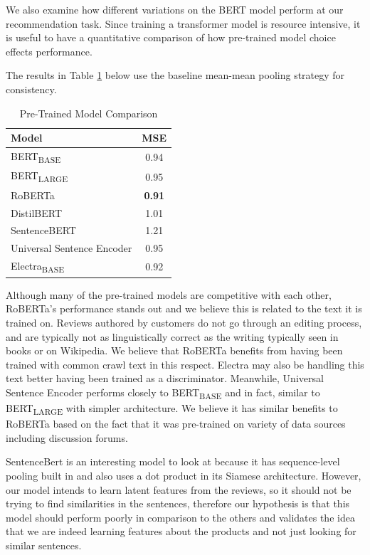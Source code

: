 \documentclass[11pt,a4paper]{article}
\begin{document}
We also examine how different variations on the BERT model perform at our recommendation task.  Since training a transformer model is resource intensive, it is useful to have a quantitative comparison of how pre-trained model choice effects performance.  

The results in Table \ref{table:2} below use the baseline mean-mean pooling strategy for consistency.

\begin{table}[H]
\centering
\small
\begin{tabular}{@{} l c @{}}
\toprule
\multicolumn{1}{l}{\textbf{Model}}    & \textbf{MSE}  \\ 
\midrule
 BERT\textsubscript{BASE} \citep{devlin2019bert} & 0.94 \\ 
 BERT\textsubscript{LARGE} & 0.95 \\
 RoBERTa \citep{liu2019roberta} & \textbf{0.91} \\
 DistilBERT \citep{sanh2020distilbert} & 1.01 \\
 SentenceBERT \citep{reimers2019sentencebert}  & 1.21 \\
 Universal Sentence Encoder \citep{cer2018universal}  & 0.95 \\
 Electra\textsubscript{BASE} \citep{clark2020electra} & 0.92 \\
\bottomrule
\end{tabular}
\caption{Pre-Trained Model Comparison}
\label{table:2}
\end{table}

Although many of the pre-trained models are competitive with each other, RoBERTa's performance stands out and we believe this is related to the text it is trained on.  Reviews authored by customers do not go through an editing process, and are typically not as linguistically correct as the writing typically seen in books or on Wikipedia.  We believe that RoBERTa benefits from having been trained with common crawl text in this respect.  Electra may also be handling this text better having been trained as a discriminator. Meanwhile, Universal Sentence Encoder performs closely to BERT\textsubscript{BASE} and in fact, similar to BERT\textsubscript{LARGE} with simpler architecture. We believe it has similar benefits to RoBERTa based on the fact that it was pre-trained on variety of data sources including discussion forums. 

SentenceBert is an interesting model to look at because it has sequence-level pooling built in and also uses a dot product in its Siamese architecture. However, our model intends to learn latent features from the reviews, so it should not be trying to find similarities in the sentences, therefore our hypothesis is that this model should perform poorly in comparison to the others and validates the idea that we are indeed learning features about the products and not just looking for similar sentences.
\end{document}
